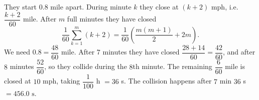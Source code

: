 They start $0.8$ mile apart. During minute $k$ they close at $(k+2)$ mph, i.e. $\dfrac{k+2}{60}$ mile. After $m$ full minutes they have closed
\[
\dfrac{1}{60}\sum_{k=1}^{m}(k+2)=\dfrac{1}{60}\left(\dfrac{m(m+1)}{2}+2m\right).
\]
We need $0.8=\dfrac{48}{60}$ mile. After $7$ minutes they have closed $\dfrac{28+14}{60}=\dfrac{42}{60}$, and after $8$ minutes $\dfrac{52}{60}$, so they collide during the $8$th minute. The remaining $\dfrac{6}{60}$ mile is closed at $10$ mph, taking $\dfrac{1}{100}$ h $=36$ s. The collision happens after $7$ min $36$ s $=\boxed{456.0\text{ s}}$.
